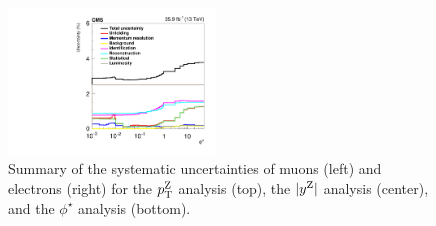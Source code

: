 \begin{figure}
        \includegraphics[width=0.49\textwidth]{figures/zpt/histoUnfoldingSystPhiStar_nsel1_dy3.pdf}
	\caption{Summary of the systematic uncertainties of muons (left) and electrons (right) 
	for the $p_{\mathrm{T}}^{\mathrm{Z}}$ analysis (top), the $|y^{\mathrm{Z}}|$ analysis (center), and the $\phi^\star$ analysis (bottom).}
	\label{fig:zpt_syst0}
\end{figure}

